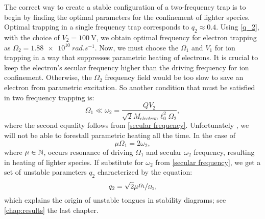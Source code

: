 The correct way to create a stable configuration of a two-frequency trap is to begin by finding the optimal parameters for the confinement of lighter species. Optimal trapping in a single frequency trap corresponds to \cite{gerlich1992inhomogeneous} $q_2 \approx 0.4$. Using \eqref{q_2}, with the choice of $V_2 = \SI{100}{\volt}$, we obtain optimal frequency for electron trapping as $\Omega_2 = \SI{1.88e10}{rad.s^{-1}}$. Now, we must choose the $\Omega_1$ and $V_1$ for ion trapping in a way that suppresses parametric heating of electrons. It is crucial to keep the electron's secular frequency higher than the driving frequency for ion confinement. Otherwise, the $\Omega_2$ frequency field would be too slow to save an electron from parametric excitation. So another condition that must be satisfied in two frequency trapping is:
\begin{equation}
	\Omega_1 \ll \omega_2 = \dfrac{Q V_2}{\sqrt{2} M_{electron} \ell_0^2 \Omega_2},
\end{equation}
where the second equality follows from \eqref{secular frequency}. Unfortunately \cite{FOOT2018117}, we will not be able to forestall parametric heating all the time. In the case of $$\mu \Omega_1 = 2 \omega_2,$$
where $\mu \in \mathbb{N}$, occurs resonance of driving $\Omega_1$ and secular $\omega_2$ frequency, resulting in heating of lighter species. If substitute for $\omega_2$ from \eqref{secular frequency}, we get a set of unstable parameters $q_2$ characterized by the equation:
\begin{equation}
	\label{unstable q_2}
	q_2 = \sqrt{2}\mu\nicefrac{\Omega_1}{\Omega_2},
\end{equation}
which explains the origin of unstable tongues in stability diagrams; see \ref{chap:results} the last chapter.


\begin{comment}%
\xxx{\dots build a little bridge from the section explaining a single frequency trap. We need two frequencies for particles with widely different charge to mass ratios: $Q_m \equiv \nicefrac{Q}{m}$ \cite{FOOT2018117}.}
In the case of a linear quadrupole with perfectly hyperbolical electrodes with cylindrical symmetry we have a electric potential in the form:\todo{this should be the right potential}
\begin{equation}
	V(t, \vb{r}) = \bigg[ V_0 + V_1 cos(\Omega_1 t) + V_2 \cos(\Omega_2 t) \bigg] \frac{x^2 + y^2 \minus 2 z^2 }{2 \ell_0^2},
\end{equation}
where $V_0$ is an amplitude of static potential, $V_1$ of slower potential and $V_2$ is an amplitude of rapidly oscillating potential on the electrode. The equations of motion for a particle in such potential, after change of variable: $\tau = \nicefrac{t\Omega_2}{2}$ are:
\end{comment}%

